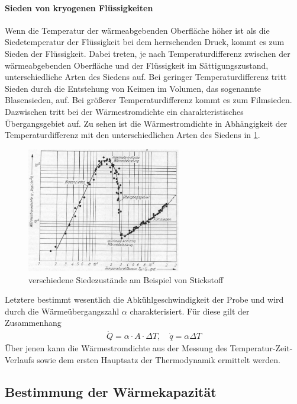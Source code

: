 \documentclass[parskip=half, a4paper,twoside,final]{article}
\begin{document}
\paragraph{Sieden von kryogenen Flüssigkeiten}\label{sec:Sieden}
Wenn die Temperatur der wärmeabgebenden Oberfläche höher ist als die Siedetemperatur der Flüssigkeit bei dem herrschenden Druck, kommt es zum Sieden der Flüssigkeit. Dabei treten, je nach Temperaturdifferenz zwischen der wärmeabgebenden Oberfläche und der Flüssigkeit im Sättigungszustand, unterschiedliche Arten des Siedens auf. Bei geringer Temperaturdifferenz tritt Sieden durch die Entstehung von Keimen im Volumen, das sogenannte Blasensieden, auf. Bei größerer Temperaturdifferenz kommt es zum Filmsieden. Dazwischen tritt bei der Wärmestromdichte ein charakteristisches Übergangsgebiet auf. Zu sehen ist die Wärmestromdichte in Abhängigkeit der Temperaturdifferenz mit den unterschiedlichen Arten des Siedens in \ref{fig:Wärmestromdichte}.
\begin{figure}[htp]
    \centering
        \includegraphics[width=0.6\textwidth]{Bilder/Filmsieden_Blasensieden.pdf}
    \caption{verschiedene Siedezustände am Beispiel von Stickstoff}
    \label{fig:Wärmestromdichte}
\end{figure}

Letztere bestimmt wesentlich die Abkühlgeschwindigkeit der Probe und wird durch die Wärmeübergangszahl $\alpha$ charakterisiert. Für diese gilt der Zusammenhang
\begin{align}\label{eqn:Waermeuebergangszahl}
  \dot{Q}=\alpha\cdot A \cdot \Delta T, \quad \dot{q}=\alpha\Delta T
\end{align}
Über jenen kann die Wärmestromdichte aus der Messung des Temperatur-Zeit-Verlaufs sowie dem ersten Hauptsatz der Thermodynamik ermittelt werden.

\subsection{Bestimmung der Wärmekapazität}
\end{document}

